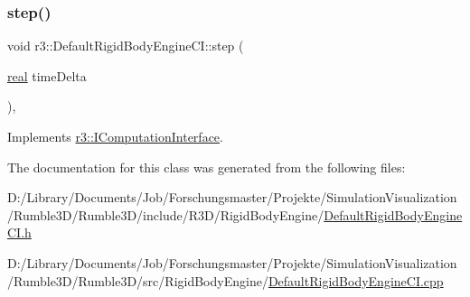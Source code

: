 \subsubsection{\texorpdfstring{step()}{step()}}
{\footnotesize\ttfamily void r3\+::\+Default\+Rigid\+Body\+Engine\+C\+I\+::step (\begin{DoxyParamCaption}\item[{\mbox{\hyperlink{namespacer3_ab2016b3e3f743fb735afce242f0dc1eb}{real}}}]{time\+Delta }\end{DoxyParamCaption})\hspace{0.3cm}{\ttfamily [override]}, {\ttfamily [virtual]}}



Implements \mbox{\hyperlink{classr3_1_1_i_computation_interface_aaa12bcc35005f32a1984b38de97696cb}{r3\+::\+I\+Computation\+Interface}}.



The documentation for this class was generated from the following files\+:\begin{DoxyCompactItemize}
\item 
D\+:/\+Library/\+Documents/\+Job/\+Forschungsmaster/\+Projekte/\+Simulation\+Visualization/\+Rumble3\+D/\+Rumble3\+D/include/\+R3\+D/\+Rigid\+Body\+Engine/\mbox{\hyperlink{_default_rigid_body_engine_c_i_8h}{Default\+Rigid\+Body\+Engine\+C\+I.\+h}}\item 
D\+:/\+Library/\+Documents/\+Job/\+Forschungsmaster/\+Projekte/\+Simulation\+Visualization/\+Rumble3\+D/\+Rumble3\+D/src/\+Rigid\+Body\+Engine/\mbox{\hyperlink{_default_rigid_body_engine_c_i_8cpp}{Default\+Rigid\+Body\+Engine\+C\+I.\+cpp}}\end{DoxyCompactItemize}
